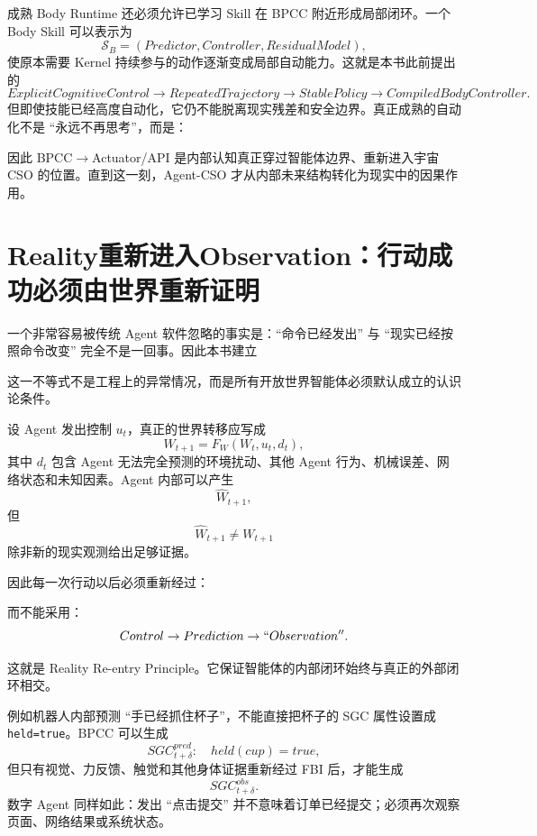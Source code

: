 成熟 Body Runtime 还必须允许已学习 Skill 在 BPCC 附近形成局部闭环。一个 Body Skill 可以表示为
\[
\mathcal S_B
=
(Predictor,Controller,ResidualModel),
\]
使原本需要 Kernel 持续参与的动作逐渐变成局部自动能力。这就是本书此前提出的
\[
ExplicitCognitiveControl
\rightarrow
RepeatedTrajectory
\rightarrow
StablePolicy
\rightarrow
CompiledBodyController .
\]
但即使技能已经高度自动化，它仍不能脱离现实残差和安全边界。真正成熟的自动化不是 ``永远不再思考''，而是：
\begin{statementbox}
\centering
{}
\end{statementbox}

因此 BPCC$\rightarrow$Actuator/API 是内部认知真正穿过智能体边界、重新进入宇宙 CSO 的位置。直到这一刻，Agent-CSO 才从内部未来结构转化为现实中的因果作用。


\section{Reality重新进入Observation：行动成功必须由世界重新证明}

一个非常容易被传统 Agent 软件忽略的事实是：``命令已经发出'' 与 ``现实已经按照命令改变'' 完全不是一回事。因此本书建立
\begin{statementbox}
\centering
{}
\end{statementbox}
这一不等式不是工程上的异常情况，而是所有开放世界智能体必须默认成立的认识论条件。

设 Agent 发出控制 $u_t$，真正的世界转移应写成
\[
W_{t+1}
=
F_W
\left(
W_t,
u_t,
d_t
\right),
\]
其中 $d_t$ 包含 Agent 无法完全预测的环境扰动、其他 Agent 行为、机械误差、网络状态和未知因素。Agent 内部可以产生
\[
\hat W_{t+1},
\]
但
\[
\hat W_{t+1}\neq W_{t+1}
\]
除非新的现实观测给出足够证据。

因此每一次行动以后必须重新经过：
\begin{statementbox}
\centering
{}
\end{statementbox}
而不能采用：
\[
Control
\rightarrow
Prediction
\rightarrow
``Observation'' .
\]

这就是 Reality Re-entry Principle。它保证智能体的内部闭环始终与真正的外部闭环相交。

例如机器人内部预测 ``手已经抓住杯子''，不能直接把杯子的 SGC 属性设置成 \texttt{held=true}。BPCC 可以生成
\[
SGC^{pred}_{t+\delta}:
\quad held(cup)=true ,
\]
但只有视觉、力反馈、触觉和其他身体证据重新经过 FBI 后，才能生成
\[
SGC^{obs}_{t+\delta} .
\]
数字 Agent 同样如此：发出 ``点击提交'' 并不意味着订单已经提交；必须再次观察页面、网络结果或系统状态。

